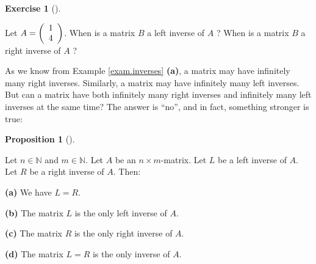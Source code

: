 \documentclass[numbers=enddot,12pt,final,onecolumn,notitlepage]{scrartcl}%
\newcounter{exer}
\theoremstyle{definition}
\newtheorem{prop}[theo]{Proposition}
\newenvironment{proposition}[1][]
{\begin{prop}[#1]\begin{leftbar}}
{\end{leftbar}\end{prop}}
\newtheorem{exmp}[exer]{Exercise}
\newenvironment{exercise}[1][]
{\begin{exmp}[#1]\begin{leftbar}}
{\end{leftbar}\end{exmp}}
\begin{document}
\begin{exercise}
\label{exe.exam.inverses}Let $A=\left(
\begin{array}
[c]{c}%
1\\
4
\end{array}
\right)  $. When is a matrix $B$ a left inverse of $A$ ? When is a matrix $B$
a right inverse of $A$ ?
\end{exercise}

As we know from Example \ref{exam.inverses} \textbf{(a)}, a matrix may have
infinitely many right inverses. Similarly, a matrix may have infinitely many
left inverses. But can a matrix have both infinitely many right inverses and
infinitely many left inverses at the same time? The answer is
\textquotedblleft no\textquotedblright, and in fact, something stronger is true:

\begin{proposition}
\label{prop.inverses.L=R}Let $n\in\mathbb{N}$ and $m\in\mathbb{N}$. Let $A$ be
an $n\times m$-matrix. Let $L$ be a left inverse of $A$. Let $R$ be a right
inverse of $A$. Then:

\textbf{(a)} We have $L=R$.

\textbf{(b)} The matrix $L$ is the only left inverse of $A$.

\textbf{(c)} The matrix $R$ is the only right inverse of $A$.

\textbf{(d)} The matrix $L=R$ is the only inverse of $A$.
\end{proposition}
\end{document}
